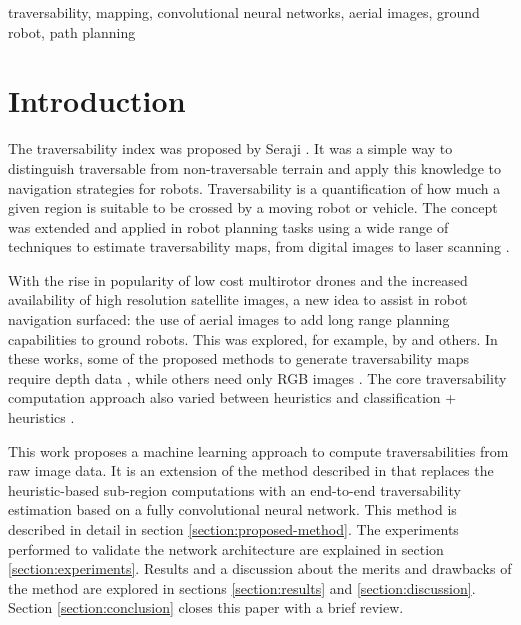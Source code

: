 \documentclass[conference]{IEEEtran}
\begin{document}
\begin{IEEEkeywords}
traversability, mapping, convolutional neural networks, aerial images, ground robot, path planning
\end{IEEEkeywords}

\section{Introduction}

The traversability index was proposed by Seraji \cite{seraji:1999}.
It was a simple way to distinguish traversable from non-traversable terrain and apply this knowledge to navigation strategies for robots.
Traversability is a quantification of how much a given region is suitable to be crossed by a moving robot or vehicle.
The concept was extended and applied in robot planning tasks using a wide range of techniques to estimate traversability maps, from digital images to laser scanning \cite{howard:2001,howard:2003,castejon:2005,guo:2008,shneier:2008}.

With the rise in popularity of low cost multirotor drones and the increased availability of high resolution satellite images, a new idea to assist in robot navigation surfaced: the use of aerial images to add long range planning capabilities to ground robots.
This was explored, for example, by \cite{vandapel:2006,hudjakov:2011,hudjakov:2013,delmerico:2017,borges:2019} and others.
In these works, some of the proposed methods to generate traversability maps require depth data \cite{vandapel:2006,delmerico:2017}, while others need only RGB images \cite{hudjakov:2011,hudjakov:2013,borges:2019}.
The core traversability computation approach also varied between heuristics \cite{vandapel:2006,borges:2019} and classification + heuristics \cite{hudjakov:2011,hudjakov:2013,delmerico:2017}.

This work proposes a machine learning approach to compute traversabilities from raw image data.
It is an extension of the method described in \cite{borges:2019} that replaces the heuristic-based sub-region computations with an end-to-end traversability estimation based on a fully convolutional neural network.
This method is described in detail in section \ref{section:proposed-method}.
The experiments performed to validate the network architecture are explained in section \ref{section:experiments}.
Results and a discussion about the merits and drawbacks of the method are explored in sections \ref{section:results} and \ref{section:discussion}.
Section \ref{section:conclusion} closes this paper with a brief review.
\end{document}
